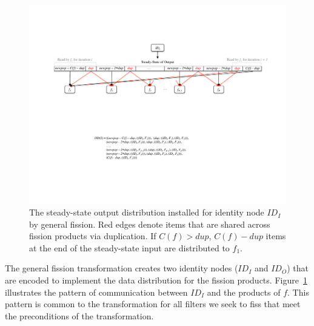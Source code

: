 \begin{figure}
\centering
\includegraphics[width=6.3in]{figures/split-pattern.pdf}
\caption[The output distribution required for general
fission.]{
The steady-state output distribution installed for identity node
$ID_I$ by general fission.  Red edges denote items that are shared
across fission products via duplication. If $C(f) > dup$, $C(f) - dup$ items at the end of the
steady-state input are distributed to
$f_1$. \label{fig:split-pattern}}
\vspace{-10pt}
\end{figure}

The general fission transformation creates two identity nodes ($ID_I$
and $ID_O$) that are encoded to implement the data distribution for
the fission products.  Figure~\ref{fig:split-pattern} illustrates the
pattern of communication between $ID_I$ and the products of $f$.  This
pattern is common to the transformation for all filters we seek to
fiss that meet the preconditions of the transformation.

